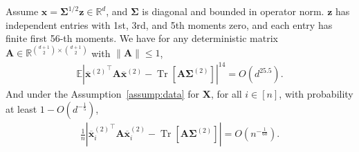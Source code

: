 \documentclass[twoside,11pt]{article}
\newcommand{\R}{\mathbb{R}}
\newcommand{\E}{\mathbb{E}}
\def\bA{{\boldsymbol A}}
\def\bX{{\boldsymbol X}}
\def\bx{{\boldsymbol x}}
\def\bz{{\boldsymbol z}}
\def\bSigma{{\boldsymbol \Sigma}}
\newcommand{\Tr}{\operatorname{Tr}}
\newcommand{\1}{\mathbf{1}}
\begin{document}
\begin{lemma}\label{lem:quad_high_power} 
Assume $\bx=\bSigma^{1/2} \bz\in\R^d$, and $\bSigma$ is diagonal and bounded in operator norm. $\bz$ has independent entries with 1st, 3rd, and 5th moments zero, and each entry has finite first 56-th moments.   We have for any deterministic matrix $\bA\in \mathbb R^{\binom{d+1}{2}\times \binom{d+1}{2}}$ with $\|\bA\|\leq 1$,
            \begin{align} \label{eq:BZ_tensor6}
    \E\left| {\overline\bx^{(2)}}^\top \bA\overline\bx^{(2)} -\Tr[\bA \bSigma^{(2)}]\right|^{14}=O(d^{25.5}).
     \end{align}
And under the Assumption~\ref{assump:data} for $\bX$, for all $i\in [n]$, with probability at least $1-O(d^{-\frac{1}{5}})$,
     \begin{align} \label{eq:unionBZ}
     \frac{1}{n}   \left| {\overline\bx_i^{(2)}}^\top \bA\overline\bx_i^{(2)} -\Tr[\bA \bSigma^{(2)}]\right|=O(n^{-\frac{1}{60}}).
     \end{align}
\end{lemma}
\end{document}
